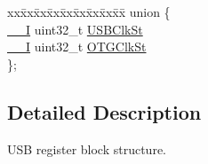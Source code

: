 \begin{DoxyCompactItemize}
\begin{tabbing}
\end{tabbing}\item 
\begin{tabbing}
xx\=xx\=xx\=xx\=xx\=xx\=xx\=xx\=xx\=\kill
union \{\\
\>\hyperlink{core__cm3_8h_af63697ed9952cc71e1225efe205f6cd3}{\_\_I} uint32\_t \hyperlink{structLPC__USB__T_a1ee9ca18d52cf4182b2a7508eb318ece}{USBClkSt}\\
\>\hyperlink{core__cm3_8h_af63697ed9952cc71e1225efe205f6cd3}{\_\_I} uint32\_t \hyperlink{structLPC__USB__T_a5027ef8b8861fd12c86417f47ddee71d}{OTGClkSt}\\
\}; \\

\end{tabbing}\end{DoxyCompactItemize}


\subsection{Detailed Description}
U\-S\-B register block structure. 

